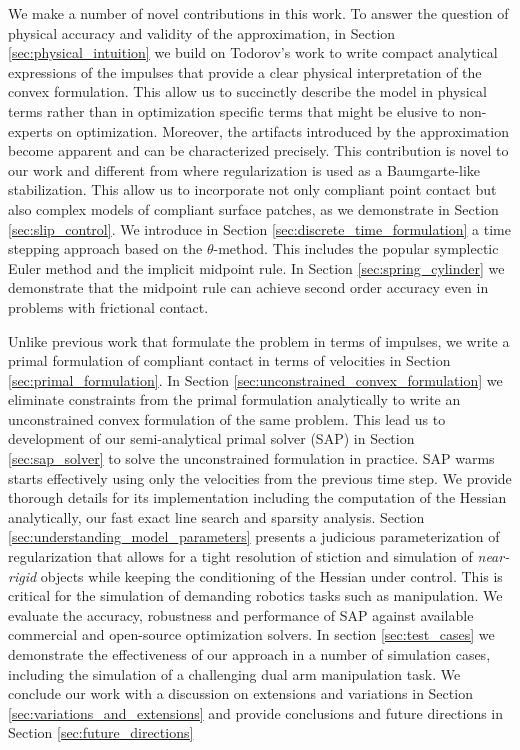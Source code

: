 We make a number of novel contributions in this work. To answer the question of
physical accuracy and validity of the approximation, in Section
\ref{sec:physical_intuition} we build on Todorov's work \cite{bib:todorov2014}
to write compact analytical expressions of the impulses that provide a clear
physical interpretation of the convex formulation. This allow us to succinctly
describe the model in physical terms rather than in optimization specific terms
that might be elusive to non-experts on optimization. Moreover, the artifacts
introduced by the approximation become apparent and can be characterized
precisely. This contribution is novel to our work and different from
\cite{bib:todorov2014} where regularization is used as a Baumgarte-like
stabilization. This allow us to incorporate not only compliant point contact but
also complex models of compliant surface patches, as we demonstrate in Section
\ref{sec:slip_control}. We introduce in Section
\ref{sec:discrete_time_formulation} a time stepping approach  based on the
$\theta\text{-method}$. This includes the popular symplectic Euler method and
the implicit midpoint rule. In Section \ref{sec:spring_cylinder} we demonstrate
that the midpoint rule can achieve second order accuracy even in problems with
frictional contact.

Unlike previous work \cite{bib:anitescu2010,bib:todorov2014} that formulate the
problem in terms of impulses, we write a primal formulation of compliant contact
in terms of velocities in Section \ref{sec:primal_formulation}. In Section
\ref{sec:unconstrained_convex_formulation} we eliminate constraints from the
primal formulation analytically to write an unconstrained convex formulation of
the same problem. This lead us to development of our semi-analytical primal
solver (SAP) in Section \ref{sec:sap_solver} to solve the unconstrained
formulation in practice. SAP warms starts effectively using only the velocities
from the previous time step. We provide thorough details for its implementation
including the computation of the Hessian analytically, our fast exact line
search and sparsity analysis. Section \ref{sec:understanding_model_parameters}
presents a judicious parameterization of regularization that allows for a tight
resolution of stiction and simulation of \emph{near-rigid} objects while keeping
the conditioning of the Hessian under control. This is critical for the
simulation of demanding robotics tasks such as manipulation. We evaluate the
accuracy, robustness and performance of SAP against available commercial and
open-source optimization solvers. In section \ref{sec:test_cases} we demonstrate
the effectiveness of our approach in a number of simulation cases, including the
simulation of a challenging dual arm manipulation task. We conclude our work
with a discussion on extensions and variations in Section
\ref{sec:variations_and_extensions} and provide conclusions and future
directions in Section \ref{sec:future_directions}
